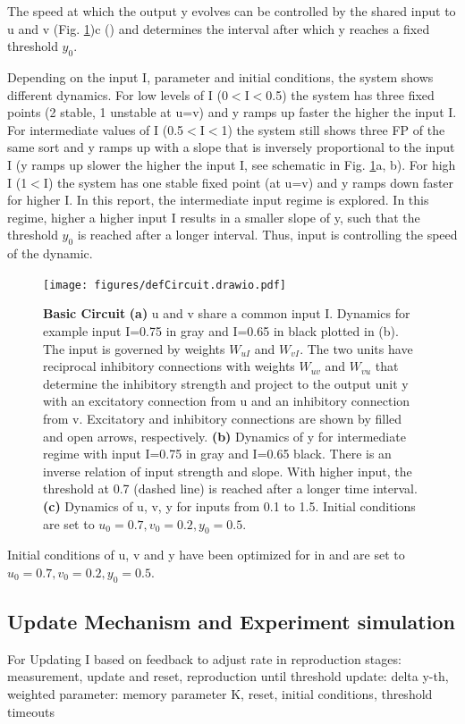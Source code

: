 \documentclass[9pt]{article}
\begin{document}
The speed at which the output y evolves can be controlled by the shared input to u and v (Fig. \ref{fig:circuit})c (\cite{Egger2020}) and determines the interval after which y reaches a fixed threshold $y_0$.

Depending on the input I, parameter and initial conditions, the system shows different dynamics. For low levels of I (0$<$I$<$0.5) the system has three fixed points (2 stable, 1 unstable at u=v) and y ramps up faster the higher the input I. 
For intermediate values of I (0.5$<$I$<$1) the system still shows three FP of the same sort and y ramps up with a slope that is inversely proportional to the input I (y ramps up slower the higher the input I, see schematic in Fig. \ref{fig:circuit}a, b). 
For high I (1$<$I) the system has one stable fixed point (at u=v) and y ramps down faster for higher I.
In this report, the intermediate input regime is explored. In this regime, higher a higher input I results in a smaller slope of y, such that the threshold $y_0$ is reached after a longer interval. Thus, input is controlling the speed of the dynamic. 

\begin{figure}[h]
	\centering
	\texttt{[image: figures/defCircuit.drawio.pdf]}
	\caption{\textbf{Basic Circuit} \textbf{(a)} u and v share a common input I. Dynamics for example input I=0.75 in gray and I=0.65 in black plotted in (b). The input is governed by weights $W_{uI}$ and $W_{vI}$. The two units have reciprocal inhibitory connections with weights $W_{uv}$ and $W_{vu}$ that determine the inhibitory strength and project to the output unit y with an excitatory connection from u and an inhibitory connection from v. Excitatory and inhibitory connections are shown by filled and open arrows, respectively. \textbf{(b)} Dynamics of y for intermediate regime with input I=0.75 in gray and I=0.65 black. There is an inverse relation of input strength and slope. With higher input, the threshold at 0.7 (dashed line) is reached after a longer time interval. \textbf{(c)} Dynamics of u, v, y for inputs from 0.1 to 1.5. Initial conditions are set to $u_0=0.7 , v_0=0.2 , y_0=0.5$.}
\label{fig:circuit}
\end{figure}


Initial conditions of u, v and y have been optimized for in \cite{Egger2020} and are set to $u_0=0.7 , v_0=0.2 , y_0=0.5$.

\subsection{Update Mechanism and Experiment simulation}
For 
Updating I based on feedback to adjust rate in reproduction
stages: measurement, update and reset, reproduction until threshold 
update: delta y-th, weighted
parameter: memory parameter K, reset, initial conditions, 
threshold 
timeouts
\end{document}
